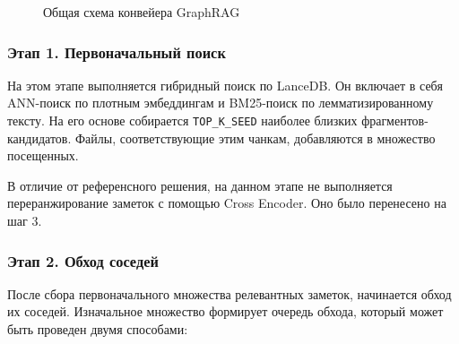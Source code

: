 \begin{figure}[H]
      \caption{Общая схема конвейера GraphRAG}
      \label{fig:graphrag_pipeline}
\end{figure}

\subsubsection*{Этап 1. Первоначальный поиск}
На этом этапе выполняется гибридный поиск по LanceDB.
Он включает в себя ANN-поиск по плотным эмбеддингам и BM25-поиск по
лемматизированному тексту. На его основе собирается \texttt{TOP\_K\_SEED}
наиболее близких фрагментов-кандидатов. Файлы, соответствующие
этим чанкам, добавляются в множество посещенных.

В отличие от референсного решения,
на данном этапе не выполняется переранжирование заметок с помощью Cross Encoder.
Оно было перенесено на шаг 3.

\subsubsection*{Этап 2. Обход соседей}

После сбора первоначального множества релевантных заметок,
начинается обход их соседей.
Изначальное множество формирует очередь обхода,
который может быть проведен двумя способами:

